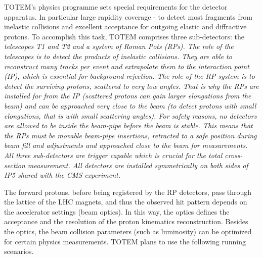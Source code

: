 TOTEM's physics programme sets special requirements for the detector apparatus. In particular large rapidity coverage - to detect most fragments from inelastic collisions and excellent acceptance for outgoing elastic and diffractive protons. To accomplish this task, TOTEM comprises three sub-detectors: the \em{telescopes T1 and T2} and a system of \em{Roman Pots} (RPs). The role of the telescopes is to detect the products of inelastic collisions. They are able to reconstruct many tracks per event and extrapolate them to the interaction point (IP), which is essential for background rejection. The role of the RP system is to detect the surviving protons, scattered to very low angles. That is why the RPs are installed far from the IP (scattered protons can gain larger elongations from the beam) and can be approached very close to the beam (to detect protons with small elongations, that is with small scattering angles). For safety reasons, no detectors are allowed to be inside the beam-pipe before the beam is stable. This means that the RPs must be movable beam-pipe insertions, retracted to a safe position during beam fill and adjustments and approached close to the beam for measurements. All three sub-detectors are trigger capable which is crucial for the total cross-section measurement. All detectors are installed symmetrically on both sides of IP5 shared with the CMS experiment.


The forward protons, before being registered by the RP detectors, pass through the lattice of the LHC magnets, and thus the observed hit pattern depends on the accelerator settings (beam optics). In this way, the optics defines the acceptance and the resolution of the proton kinematics reconstruction. Besides the optics, the beam collision parameters (such as luminosity) can be optimized for certain physics measurements. TOTEM plans to use the following running scenarios.

